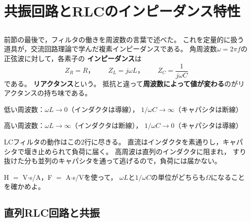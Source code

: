 \section{共振回路とRLCのインピーダンス特性}
\label{sec4.5}

\subsection{}

前節の最後で，フィルタの働きを周波数の言葉で述べた。
これを定量的に扱う道具が，交流回路理論で学んだ複素インピーダンスである。
角周波数$\omega = 2\pi f$の正弦波に対して，各素子の
\textbf{インピーダンス}は
\begin{equation}
Z_R = R，\qquad
Z_L = j\omega L，\qquad
Z_C = \frac{1}{j\omega C}
\label{eq4.14}
\end{equation}
である。
\textbf{リアクタンス}という。
抵抗と違って\textbf{周波数によって値が変わる}のがリアクタンスの持ち味である。

\begin{箇条書}
\item 低い周波数：$\omega L \to 0$（インダクタは導線），
$1/\omega C \to \infty$（キャパシタは断線）
\item 高い周波数：$\omega L \to \infty$（インダクタは断線），
$1/\omega C \to 0$（キャパシタは導線）
\end{箇条書}

LCフィルタの動作はこの2行に尽きる。
直流はインダクタを素通りし，キャパシタで堰き止められて負荷に届く。
高周波は直列のインダクタに阻まれ，
すり抜けた分も並列のキャパシタを通って逃げるので，負荷には届かない。

\begin{問}
\item H $=$ V$\cdot$s/A，F $=$ A$\cdot$s/Vを使って，
$\omega L$と$1/\omega C$の単位がどちらも$\Omega$になることを確かめよ。
\end{問}

\subsection{直列RLC回路と共振}


